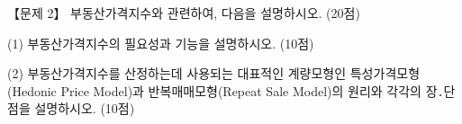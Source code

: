 \begin{longquestion}{【문제 2】}
부동산가격지수와 관련하여, 다음을 설명하시오. (20점) \par
\medskip\noindent (1) 부동산가격지수의 필요성과 기능을 설명하시오. (10점) \par
\medskip\noindent (2) 부동산가격지수를 산정하는데 사용되는 대표적인 계량모형인 특성가격모형(Hedonic Price Model)과 반복매매모형(Repeat Sale Model)의 원리와 각각의 장․단점을 설명하시오. (10점) \par
\end{longquestion}

